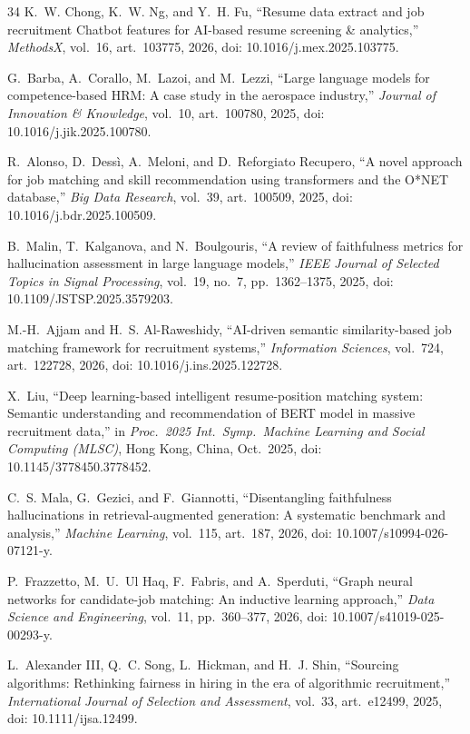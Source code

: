 \documentclass[journal]{IEEEtran}
\begin{document}
\begin{thebibliography}{34}
K.~W. Chong, K.~W. Ng, and Y.~H. Fu, ``Resume data extract and job recruitment Chatbot features for AI-based resume screening \& analytics,'' \emph{MethodsX}, vol.~16, art.~103775, 2026, doi: 10.1016/j.mex.2025.103775.

G.~Barba, A.~Corallo, M.~Lazoi, and M.~Lezzi, ``Large language models for competence-based HRM: A case study in the aerospace industry,'' \emph{Journal of Innovation \& Knowledge}, vol.~10, art.~100780, 2025, doi: 10.1016/j.jik.2025.100780.

R.~Alonso, D.~Dess\`i, A.~Meloni, and D.~Reforgiato Recupero, ``A novel approach for job matching and skill recommendation using transformers and the O*NET database,'' \emph{Big Data Research}, vol.~39, art.~100509, 2025, doi: 10.1016/j.bdr.2025.100509.

B.~Malin, T.~Kalganova, and N.~Boulgouris, ``A review of faithfulness metrics for hallucination assessment in large language models,'' \emph{IEEE Journal of Selected Topics in Signal Processing}, vol.~19, no.~7, pp.~1362--1375, 2025, doi: 10.1109/JSTSP.2025.3579203.

M.-H.~Ajjam and H.~S. Al-Raweshidy, ``AI-driven semantic similarity-based job matching framework for recruitment systems,'' \emph{Information Sciences}, vol.~724, art.~122728, 2026, doi: 10.1016/j.ins.2025.122728.

X.~Liu, ``Deep learning-based intelligent resume-position matching system: Semantic understanding and recommendation of BERT model in massive recruitment data,'' in \emph{Proc.\ 2025 Int.\ Symp.\ Machine Learning and Social Computing (MLSC)}, Hong Kong, China, Oct.~2025, doi: 10.1145/3778450.3778452.

C.~S. Mala, G.~Gezici, and F.~Giannotti, ``Disentangling faithfulness hallucinations in retrieval-augmented generation: A systematic benchmark and analysis,'' \emph{Machine Learning}, vol.~115, art.~187, 2026, doi: 10.1007/s10994-026-07121-y.

P.~Frazzetto, M.~U.~Ul Haq, F.~Fabris, and A.~Sperduti, ``Graph neural networks for candidate-job matching: An inductive learning approach,'' \emph{Data Science and Engineering}, vol.~11, pp.~360--377, 2026, doi: 10.1007/s41019-025-00293-y.

L.~Alexander III, Q.~C. Song, L.~Hickman, and H.~J. Shin, ``Sourcing algorithms: Rethinking fairness in hiring in the era of algorithmic recruitment,'' \emph{International Journal of Selection and Assessment}, vol.~33, art.~e12499, 2025, doi: 10.1111/ijsa.12499.


\end{thebibliography}
\end{document}
